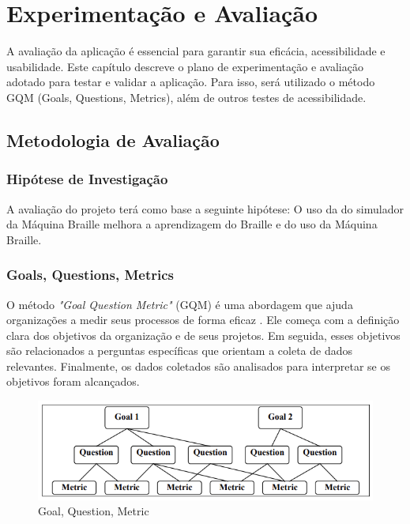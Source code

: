 \chapter{Experimentação e Avaliação} 
\label{chap:Chapter04}

A avaliação da aplicação é essencial para garantir sua eficácia, acessibilidade e usabilidade. Este capítulo descreve o plano de experimentação e avaliação adotado para testar e validar a aplicação. Para isso, será utilizado o método GQM (Goals, Questions, Metrics), além de outros testes de acessibilidade.

\section{Metodologia de Avaliação}

\subsection{Hipótese de Investigação}

A avaliação do projeto terá como base a seguinte hipótese: O uso da do simulador da Máquina Braille melhora a aprendizagem do Braille e do uso da Máquina Braille.

\subsection{Goals, Questions, Metrics}

O método \textit{"Goal Question Metric"} (GQM) é uma abordagem que ajuda organizações a medir seus processos de forma eficaz \parencite{ARTICLE13}. Ele começa com a definição clara dos objetivos da organização e de seus projetos. Em seguida, esses objetivos são relacionados a perguntas específicas que orientam a coleta de dados relevantes. Finalmente, os dados coletados são analisados para interpretar se os objetivos foram alcançados.

\begin{figure}[h]
    \centering
    \includegraphics[scale=0.5]{ch04/assets/gqm.png}
    \decoRule
    \caption[Goal, Question, Metric]{Goal, Question, Metric \parencite{ARTICLE13}}
    \label{fig:ch02-gqm}
\end{figure}

